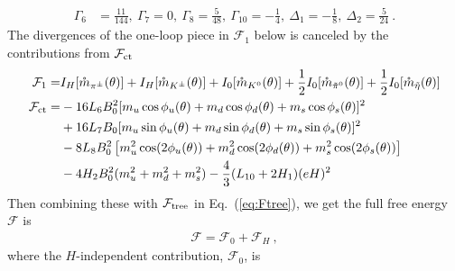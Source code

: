 \documentclass[12pt]{elsarticle}
\begin{document}
\begin{equation}
\begin{split}
\Gamma_{6}&=\frac{11}{144},\ \Gamma_{7}=0,\ \Gamma_{8}=\frac{5}{48},\ \Gamma_{10}=-\frac{1}{4},\ \Delta_{1}=-\frac{1}{8},\ \Delta_{2}=\frac{5}{24}\ .
\end{split}
\end{equation} 
The divergences of the one-loop piece in $\mathcal{F}_{1}$ below is canceled by the contributions from $\mathcal{F}_{\rm ct}$
\begin{align}
\mathcal{F}_{1}=&I_{H}[\mathring{m}_{\pi^{\pm}}(\theta)]+I_{H}[\mathring{m}_{K^{\pm}}(\theta)]+I_{0}[\mathring{m}_{K^{0}}(\theta)]+\frac{1}{2}I_{0}[\mathring{m}_{\tilde{\pi}^{0}}(\theta)]+\frac{1}{2}I_{0}[\mathring{m}_{\tilde{\eta}}(\theta)]\\\nonumber
\mathcal{F}_{\rm ct}=&-16L_{6}B_{0}^{2}[m_{u}\cos\phi_{u}(\theta)+m_{d}\cos\phi_{d}(\theta)+m_{s}\cos\phi_{s}(\theta)]^{2}\\\nonumber
&+16L_{7}B_{0}[m_{u}\sin\phi_{u}(\theta)+m_{d}\sin\phi_{d}(\theta)+m_{s}\sin\phi_{s}(\theta)]^{2}\\\nonumber
&-8L_{8}B_{0}^{2}\left[m_{u}^{2}\cos(2\phi_{u}(\theta))+m_{d}^{2}\cos(2\phi_{d}(\theta))+m_{s}^{2}\cos(2\phi_{s}(\theta))\right]\\
&-4H_{2}B_{0}^{2}(m_{u}^{2}+m_{d}^{2}+m_{s}^{2})-\frac{4}{3}(L_{10}+2H_{1})(eH)^{2}\ 
\end{align}
Then combining these with $\mathcal{F}_{\rm tree}$ in Eq.~(\ref{eq:Ftree}), we get the full free energy $\mathcal{F}$ is
\begin{align}
\mathcal{F}=\mathcal{F}_{0}+\mathcal{F}_{H}\ ,
\end{align}
where the $H$-independent contribution, $\mathcal{F}_{0}$, is
\end{document}
